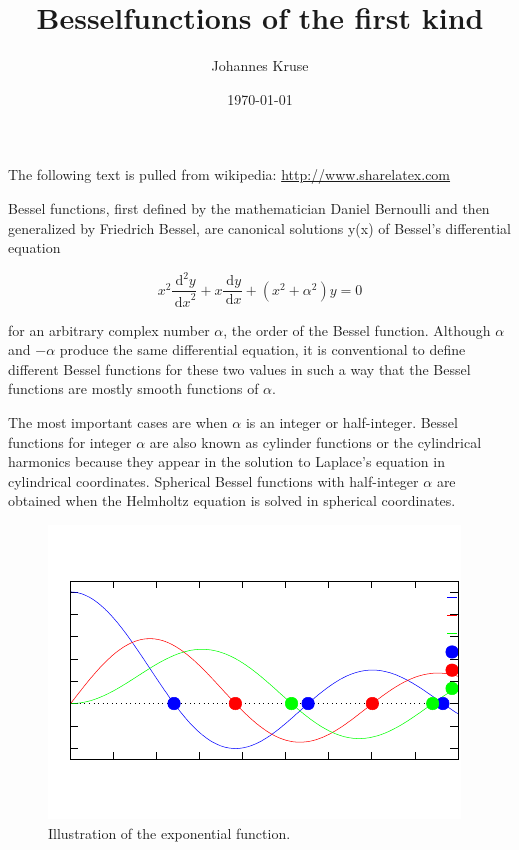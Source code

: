 \documentclass[english,a4paper,twocolumn,article,10pt]{memoir}
\title{Besselfunctions of the first kind}
\author{Johannes Kruse}
\date{\today}
\newcommand\dx[1]{\,\text{d}#1}
\begin{document}
\maketitle
The following text is pulled from wikipedia: \url{http://www.sharelatex.com}

Bessel functions, first defined by the mathematician Daniel Bernoulli and then generalized by Friedrich Bessel, are canonical solutions y(x) of Bessel's differential equation


\begin{equation}
x^2 \frac{{\dx{}}^2 y}{{\dx{x}}^2} + x \frac{\dx{} y}{\dx{x}} + (x^2 + {\alpha}^2) y = 0
\end{equation}

for an arbitrary complex number $\alpha$, the order of the Bessel function. Although $\alpha$ and −$\alpha$ produce the same differential equation, it is conventional to define different Bessel functions for these two values in such a way that the Bessel functions are mostly smooth functions of $\alpha$.

The most important cases are when $\alpha$ is an integer or half-integer. Bessel functions for integer $\alpha$ are also known as cylinder functions or the cylindrical harmonics because they appear in the solution to Laplace's equation in cylindrical coordinates. Spherical Bessel functions with half-integer $\alpha$ are obtained when the Helmholtz equation is solved in spherical coordinates.

\begin{figure}[h]
	\includegraphics{Bessel-eps-converted-to.pdf}
	\caption{Illustration of the exponential function.}
\end{figure}
\end{document}
